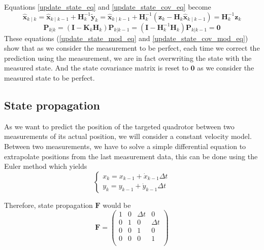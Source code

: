 \documentclass[12pt]{article}
\begin{document}
Equations \ref{update_state_eq} and \ref{update_state_cov_eq} become
\begin{equation}
\hat{\mathbf{x}}_{k\mid k}
= \hat{\mathbf{x}}_{k\mid k-1} + \mathbf{H}_k^{-1}\tilde{\mathbf{y}}_k
= \hat{\mathbf{x}}_{k\mid k-1} + \mathbf{H}_k^{-1}(\mathbf{z}_k - \mathbf{H}_k\hat{\mathbf{x}}_{k\mid k-1})
= \mathbf{H}_k^{-1}\mathbf{z}_k
\label{update_state_mod_eq}
\end{equation}
\begin{equation}
\mathbf{P}_{k|k}
= (\mathbf{I} - \mathbf{K}_k \mathbf{H}_k) \mathbf{P}_{k|k-1}
= (\mathbf{I} - \mathbf{H}_k^{-1} \mathbf{H}_k) \mathbf{P}_{k|k-1}
= \mathbf{0}
\label{update_state_cov_mod_eq}
\end{equation}
These equations (\ref{update_state_mod_eq} and \ref{update_state_cov_mod_eq}) show that as we consider the measurement to be perfect, each time we correct the prediction using the measurement, we are in fact overwriting the state with the measured state.
And the state covariance matrix is reset to $\mathbf{0}$ as we consider the measured state to be perfect.

\subsection{State propagation}
As we want to predict the position of the targeted quadrotor between two measurements of its actual position, we will consider a constant velocity model.
Between two measurements, we have to solve a simple differential equation to extrapolate positions from the last measurement data, this can be done using the Euler method which yields
\begin{equation}
\left\{
    \begin{array}{l}
    x_k = x_{k-1} + \dot{x}_{k-1}\Delta{t} \\
    y_k = y_{k-1} + \dot{y}_{k-1}\Delta{t}
    \end{array}
\right.
\end{equation}

Therefore, state propagation $\mathbf{F}$ would be
\begin{equation}
\mathbf{F} =
    \begin{pmatrix}
        1 & 0 & \Delta{t} & 0 \\
        0 & 1 & 0 & \Delta{t} \\
        0 & 0 & 1 & 0 \\
        0 & 0 & 0 & 1 \\
    \end{pmatrix}
\end{equation}
\end{document}
